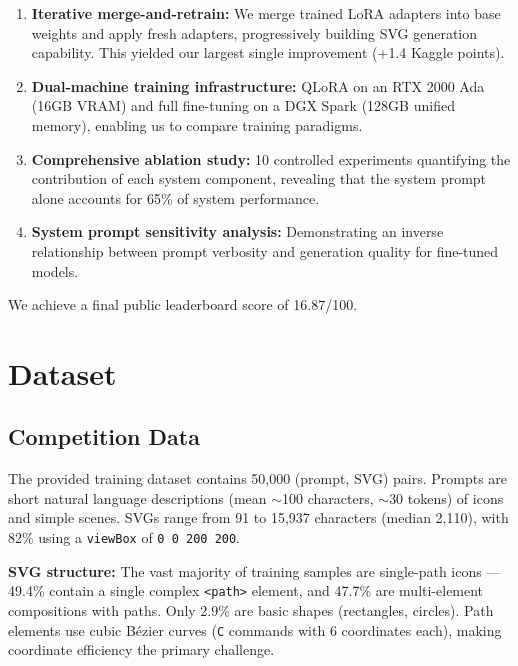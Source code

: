 \documentclass[11pt]{article}
\begin{document}
\begin{enumerate}
    \item \textbf{Iterative merge-and-retrain:} We merge trained LoRA adapters into base weights and apply fresh adapters, progressively building SVG generation capability. This yielded our largest single improvement (+1.4 Kaggle points).
    \item \textbf{Dual-machine training infrastructure:} QLoRA on an RTX 2000 Ada (16GB VRAM) and full fine-tuning on a DGX Spark (128GB unified memory), enabling us to compare training paradigms.
    \item \textbf{Comprehensive ablation study:} 10 controlled experiments quantifying the contribution of each system component, revealing that the system prompt alone accounts for 65\% of system performance.
    \item \textbf{System prompt sensitivity analysis:} Demonstrating an inverse relationship between prompt verbosity and generation quality for fine-tuned models.
\end{enumerate}

We achieve a final public leaderboard score of 16.87/100.

\section{Dataset}

\subsection{Competition Data}

The provided training dataset contains 50,000 (prompt, SVG) pairs. Prompts are short natural language descriptions (mean $\sim$100 characters, $\sim$30 tokens) of icons and simple scenes. SVGs range from 91 to 15,937 characters (median 2,110), with 82\% using a \texttt{viewBox} of \texttt{0 0 200 200}.

\textbf{SVG structure:} The vast majority of training samples are single-path icons --- 49.4\% contain a single complex \texttt{<path>} element, and 47.7\% are multi-element compositions with paths. Only 2.9\% are basic shapes (rectangles, circles). Path elements use cubic B\'{e}zier curves (\texttt{C} commands with 6 coordinates each), making coordinate efficiency the primary challenge.
\end{document}
